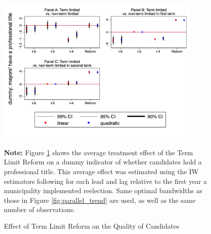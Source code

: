 \documentclass[12pt]{amsart}
\numberwithin{equation}{section}
\theoremstyle{definition}
\theoremstyle{definition}
\theoremstyle{definition}
\begin{document}
 \begin{figure}[h]   
\centering
 \caption{Effect of Term Limit Reform on the Quality of Candidates}
 \label{fig:quality_trend}
\includegraphics[width=0.9\textwidth]{../Figures_incumbency/quality_parallel.png}
       \captionsetup{justification=centering}
         
 \textbf{Note:} Figure \ref{fig:quality_trend} shows the average treatment effect of the Term Limit Reform on a dummy indicator of whether candidates hold a professional title. This average effect was estimated using the IW estimators following \citet{abraham_sun_2020} for each lead and lag relative to the first year a municipality implemented reelection. Same optimal bandwidths as those in Figure \ref{fig:parallel_trend} are used, as well as the same number of observations.  
 
\end{figure}     

  
	
\end{document}

